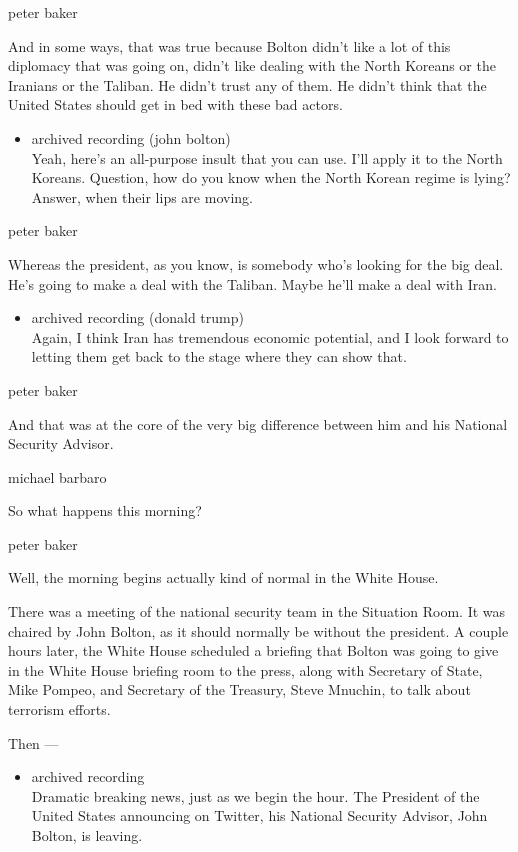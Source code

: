 peter baker

And in some ways, that was true because Bolton didn't like a lot of this
diplomacy that was going on, didn't like dealing with the North Koreans
or the Iranians or the Taliban. He didn't trust any of them. He didn't
think that the United States should get in bed with these bad actors.

\begin{itemize}
\tightlist
\item
  archived recording (john bolton)\\
  Yeah, here's an all-purpose insult that you can use. I'll apply it to
  the North Koreans. Question, how do you know when the North Korean
  regime is lying? Answer, when their lips are moving.
\end{itemize}

peter baker

Whereas the president, as you know, is somebody who's looking for the
big deal. He's going to make a deal with the Taliban. Maybe he'll make a
deal with Iran.

\begin{itemize}
\tightlist
\item
  archived recording (donald trump)\\
  Again, I think Iran has tremendous economic potential, and I look
  forward to letting them get back to the stage where they can show
  that.
\end{itemize}

peter baker

And that was at the core of the very big difference between him and his
National Security Advisor.

michael barbaro

So what happens this morning?

peter baker

Well, the morning begins actually kind of normal in the White House.

There was a meeting of the national security team in the Situation Room.
It was chaired by John Bolton, as it should normally be without the
president. A couple hours later, the White House scheduled a briefing
that Bolton was going to give in the White House briefing room to the
press, along with Secretary of State, Mike Pompeo, and Secretary of the
Treasury, Steve Mnuchin, to talk about terrorism efforts.

Then ---

\begin{itemize}
\tightlist
\item
  archived recording\\
  Dramatic breaking news, just as we begin the hour. The President of
  the United States announcing on Twitter, his National Security
  Advisor, John Bolton, is leaving.
\end{itemize}


